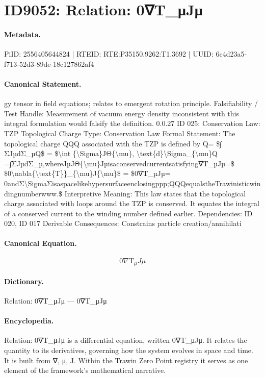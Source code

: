 \section*{ID9052: Relation: 0∇T\_μJμ}
\paragraph{Metadata.}
PiID: 2556405644824 | RTEID: RTE:P35150.9262:T1.3692 | UUID: 6c4d23a5-f713-52d3-89de-18c127862af4

\paragraph{Canonical Statement.}
gy tensor in field equations; relates to emergent rotation principle. Falsifiability / Test Handle: Measurement of vacuum energy density inconsistent with this integral formulation would falsify the definition. 0.0.27 ID 025: Conservation Law: TZP Topological Charge Type: Conservation Law Formal Statement: The topological charge QQQ associated with the TZP is defined by Q= \$∫ ΣJµdΣ\_µQ\$ = \$\textbackslash{}int \{\textbackslash{}Sigma\}JΘ\{\textbackslash{}mu\}, \textbackslash{}text\{d\}\textbackslash{}Sigma\_\{\textbackslash{}mu\}Q =∫ΣJµdΣ\_µ,whereJµJΘ\{\textbackslash{}mu\}Jµisaconservedcurrentsatisfying∇T\_µJµ=\$ \$0\textbackslash{}nabla\{\textbackslash{}text\{T\}\}\_\{\textbackslash{}mu\}J\{\textbackslash{}mu\}\$ = \$0∇T\_µJµ= 0andΣ\textbackslash{}SigmaΣisaspacelikehypersurfaceenclosingppp;QQQequalstheTrawinisticwindingnumberwww.\$ Interpretive Meaning: This law states that the topological charge associated with loops around the TZP is conserved. It equates the integral of a conserved current to the winding number defined earlier. Dependencies: ID 020, ID 017 Derivable Consequences: Constrains particle creation/annihilati

\paragraph{Canonical Equation.}
\[
0\nabla{\text{T}}_{\mu}J{\mu}
\]

\paragraph{Dictionary.}
Relation: 0∇T\_μJμ — 0∇T\_μJμ

\paragraph{Encyclopedia.}
Relation: 0∇T\_μJμ is a differential equation, written 0∇T\_μJμ. It relates the quantity to its derivatives, governing how the system evolves in space and time. It is built from ∇, μ, J. Within the Trawin Zero Point registry it serves as one element of the framework's mathematical narrative.
